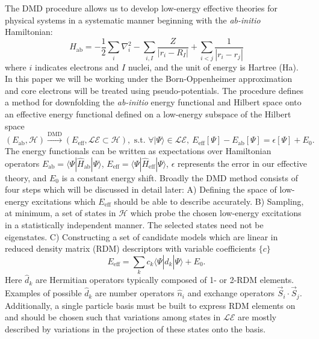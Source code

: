\documentclass[12pt]{article}
\begin{document}
The DMD procedure allows us to develop low-energy effective theories for physical systems in a systematic manner beginning with the \textit{ab-initio} Hamiltonian:
\begin{equation}
\hat{H}_\text{ab} = -\frac{1}{2} \sum_{i} \nabla_i^2 - \sum_{i,I}\frac{Z}{|r_i - R_I|} + \sum_{i<j}\frac{1}{|r_i - r_j|}
\label{eq:Hab}
\end{equation}
where $i$ indicates electrons and $I$ nuclei, and the unit of energy is Hartree (Ha).
In this paper we will be working under the Born-Oppenheimer approximation and core electrons will be treated using pseudo-potentials.
The procedure defines a method for downfolding the \textit{ab-initio} energy functional and Hilbert space onto an effective energy functional defined on a low-energy subspace of the Hilbert space 
\begin{equation}
(E_\text{ab}, \mathcal{H}) \xrightarrow{\text{DMD}} (E_\text{eff}, \mathcal{LE} \subset \mathcal{H}), \text{ s.t. }
\forall |\Psi\rangle \in \mathcal{LE}, \ E_\text{eff}[\Psi] - E_\text{ab}[\Psi] = \epsilon[\Psi] + E_0.
\label{eq:DMD}
\end{equation} 
The energy functionals can be written as expectations over Hamiltonian operators $E_\text{ab} = \langle \Psi | \hat{H}_\text{ab} |\Psi \rangle$, $E_\text{eff} = \langle \Psi | \hat{H}_\text{eff} |\Psi \rangle$, $\epsilon$ represents the error in our effective theory, and $E_0$ is a constant energy shift.
Broadly the DMD method consists of four steps which will be discussed in detail later: 
A) Defining the space of low-energy excitations which $E_\text{eff}$ should be able to describe accurately.
B) Sampling, at minimum, a set of states in $\mathcal{H}$ which probe the chosen low-energy excitations in a statistically independent manner. The selected states need not be eigenstates. 
C) Constructing a set of candidate models which are linear in reduced density matrix (RDM) descriptors with variable coefficients $\{c\}$
\begin{equation}
E_\text{eff} = \sum_k c_k \langle \Psi | \hat{d}_k |\Psi \rangle + E_0.
\label{eq:Eeff}
\end{equation}
Here $\hat{d}_k$ are Hermitian operators typically composed of 1- or 2-RDM elements. 
Examples of possible $\hat{d}_k$ are number operators $\hat{n}_i$ and exchange operators $\vec{S}_i \cdot \vec{S}_j$.
Additionally, a single particle basis must be built to express RDM elements on and should be chosen such that variations among states in $\mathcal{LE}$ are mostly described by variations in the projection of these states onto the basis.
\end{document}
